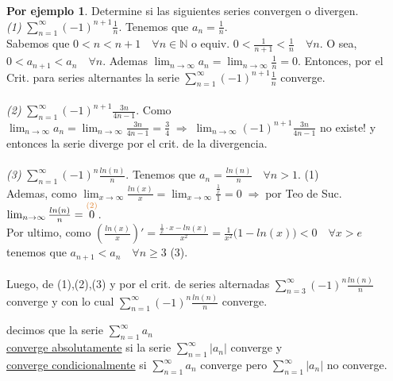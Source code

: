 \documentclass{article}
\theoremstyle{definition}
\theoremstyle{definition}
\newtheorem*{ej}{Por ejemplo}
\theoremstyle{remark}
\begin{document}
\begin{ej}
  Determine si las siguientes series convergen o divergen. \\
  \emph{(1)} \quad $\sum_{n=1}^{\infty}{(-1)^{n+1}\frac{1}{n}}$. Tenemos que $a_n=\frac{1}{n}$. \\
  Sabemos que $0<n<n+1 \quad \forall n \in \mathbb{N}$ o equiv. $0<\frac{1}{n+1}<\frac{1}{n} \quad \forall n$. O sea, $0<a_{n+1}<a_n \quad \forall n$. Ademas $\lim_{n \to \infty}{a_n}=\lim_{n\to\infty}{\frac{1}{n}}=0.$ Entonces, por el Crit. para series alternantes la serie $\sum_{n=1}^{\infty}{(-1)^{n+1}\frac{1}{n}}$ converge. \\ \\

  \emph{(2)} \quad $\sum_{n=1}^{\infty}{(-1)^{n+1}{\frac{3n}{4n-1}}}$. Como $\lim_{n\to\infty}{a_n}=\lim_{n\to\infty}{\frac{3n}{4n-1}}=\frac{3}{4} \; \Rightarrow \; \lim_{n\to\infty}{(-1)^{n+1}\frac{3n}{4n-1}}$ no existe! y entonces la serie diverge por el crit. de la divergencia.
\\
\\
\emph{(3)} \quad $\sum_{n=1}^{\infty}{(-1)^{n}\frac{ln(n)}{n}}$. Tenemos que $a_n=\frac{ln(n)}{n}\quad \forall n > 1$. \textcolor{rojop2}{(1)} \\
Ademas, como $\lim_{x \to \infty}{\frac{ln(x)}{x}}=\lim_{x\to\infty}{\frac{\frac{1}{x}}{1}}=0 \; \Rightarrow \; $por Teo de Suc. $\lim_{n \to \infty}{\frac{ln(n)}{n}}=\overset{\textcolor{rojop2}{(2)}}{0}$.  \\
Por ultimo, como $\left(\frac{ln(x)}{x}\right)'=\frac{\frac{1}{x}\cdot x -ln(x)}{x^2}=\frac{1}{x^2}\big(1-ln(x)\big)<0 \quad \forall x >e$ \\
tenemos que $a_{n+1}<a_n \quad \forall n \geq 3$ \textcolor{rojop2}{(3)}. \\\\
Luego, de \textcolor{rojop2}{(1)},\textcolor{rojop2}{(2)},\textcolor{rojop2}{(3)} y por el crit. de series alternadas $\sum_{n=3}^{\infty}{(-1)^{n}\frac{ln(n)}{n}}$ converge y con lo cual $\sum_{n=1}^{\infty}{(-1)^{n}\frac{ln(n)}{n}}$ converge. 
\end{ej}

\begin{defi}
  decimos que la serie $\sum_{n=1}^{\infty}{a_n}$ \\
  \underline{converge absolutamente} si la serie $\sum_{n=1}^{\infty}{|a_n|}$ converge y \\
  \underline{converge condicionalmente} si $\sum_{n=1}^{\infty}{a_n}$ converge pero $\sum_{n=1}^{\infty}{|a_n|}$ no converge.
\end{defi}
\end{document}
